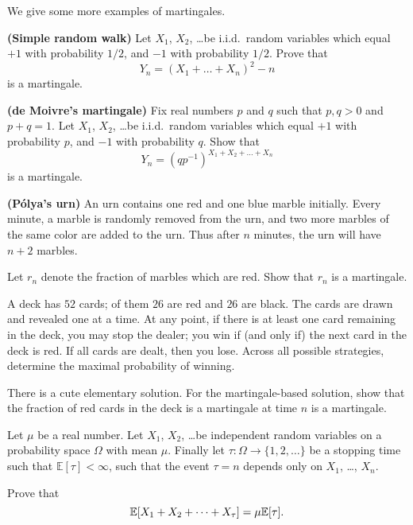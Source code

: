 \begin{problem}
	We give some more examples of martingales.
	\begin{enumerate}[(a)]
		\ii \textbf{(Simple random walk)}
		Let $X_1$, $X_2$, \dots be i.i.d.\ random variables
		which equal $+1$ with probability $1/2$,
		and $-1$ with probability $1/2$.
		Prove that
		\[ Y_n = \left( X_1 + \dots + X_n \right)^2 - n \]
		is a martingale.

		\ii \textbf{(de Moivre's martingale)}
		Fix real numbers $p$ and $q$ such that $p,q > 0$ and $p+q=1$.
		Let $X_1$, $X_2$, \dots be i.i.d.\ random variables
		which equal $+1$ with probability $p$,
		and $-1$ with probability $q$.
		Show that
		\[ Y_n = \left(qp^{-1}\right)^{X_1 + X_2 + \dots + X_n} \]
		is a martingale.

		\ii \textbf{(P\'{o}lya's urn)}
		An urn contains one red and one blue marble initially.
		Every minute, a marble is randomly removed from the urn,
		and two more marbles of the same color are added to the urn.
		Thus after $n$ minutes, the urn will have $n+2$ marbles.

		Let $r_n$ denote the fraction of marbles which are red.
		Show that $r_n$ is a martingale.
	\end{enumerate}
\end{problem}

\begin{problem}
	A deck has $52$ cards; of them $26$ are red and $26$ are black.
	The cards are drawn and revealed one at a time.
	At any point, if there is at least one card remaining in the deck,
	you may stop the dealer;
	you win if (and only if) the next card in the deck is red.
	If all cards are dealt, then you lose.
	Across all possible strategies,
	determine the maximal probability of winning.
	\begin{hint}
		There is a cute elementary solution.
		For the martingale-based solution,
		show that the fraction of red cards in the deck is a martingale
		at time $n$ is a martingale.
	\end{hint}
\end{problem}

\begin{problem}
	Let $\mu$ be a real number.
	Let $X_1$, $X_2$, \dots be independent random variables
	on a probability space $\Omega$ with mean $\mu$.
	Finally let $\tau \colon \Omega \to \{1, 2, \dots\}$
	be a stopping time such that $\mathbb E[\tau] < \infty$,
	such that the event $\tau = n$ depends only on $X_1$, \dots, $X_n$.

	Prove that
	\[ \mathbb E[X_1 + X_2 + \dots + X_\tau] = \mu \mathbb E[\tau]. \]
\end{problem}

